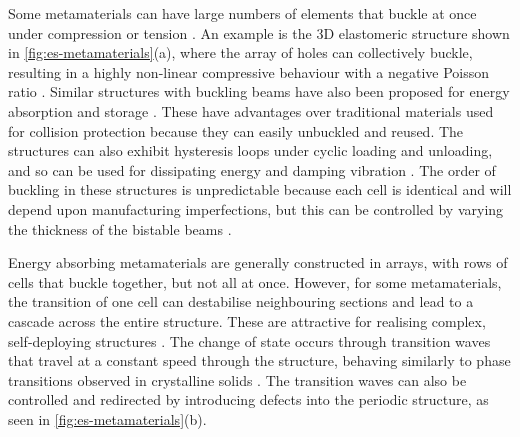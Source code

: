 Some metamaterials can have large numbers of elements that buckle at once under compression or tension \cite{Che2017,Bertoldi2017a}.
An example is the 3D elastomeric structure shown in \cref{fig:es-metamaterials}(a), where the array of holes can collectively buckle, resulting in a highly non-linear compressive behaviour with a negative Poisson ratio \cite{Bertoldi2010,Florijn2014,Bertoldi2017a,Medina2020}.
Similar structures with buckling beams have also been proposed for energy absorption and storage \cite{Shan2015,Che2017,Bertoldi2017a,Giri2021}.
These have advantages over traditional materials used for collision protection because they can easily unbuckled and reused.
The structures can also exhibit hysteresis loops under cyclic loading and unloading, and so can be used for dissipating energy and damping vibration \cite{Bertoldi2017a}.
The order of buckling in these structures is unpredictable because each cell is identical and will depend upon manufacturing imperfections, but this can be controlled by varying the thickness of the bistable beams \cite{Che2017,Giri2021}.

Energy absorbing metamaterials are generally constructed in arrays, with rows of cells that buckle together, but not all at once.
However, for some metamaterials, the transition of one cell can destabilise neighbouring sections and lead to a cascade across the entire structure.
These are attractive for realising complex, self-deploying structures \cite{Zareei2020}.
The change of state occurs through transition waves that travel at a constant speed through the structure, behaving similarly to phase transitions observed in crystalline solids \cite{Jin2020}.
The transition waves can also be controlled and redirected by introducing defects into the periodic structure, as seen in \cref{fig:es-metamaterials}(b).


